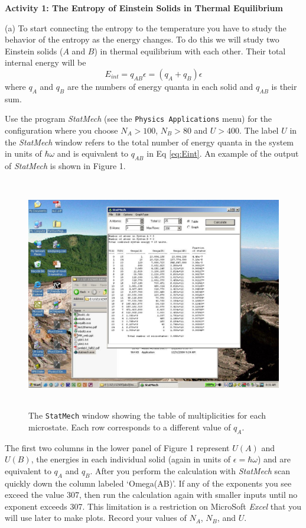 \textbf{Activity 1: The Entropy of Einstein Solids in Thermal Equilibrium}

(a) To start connecting the entropy to the temperature you have to study the 
behavior of the entropy as the energy changes.
To do this we will study two Einstein solids ($A$ and $B$) in thermal equilibrium with 
each other.
Their total internal energy will be
\begin{equation}\label{eq:Eint}
E_{int} = q_{AB}\epsilon = (q_A + q_B) \epsilon
\end{equation}
where $q_A$ and $q_B$ are the numbers of energy quanta in each solid and $q_{AB}$ is 
their sum.

Use the program {\it StatMech} (see the {\tt Physics Applications} menu)
for the configuration where you choose $N_A > 100$, $N_B > 80$ and $U>400$.
The label $U$ in the {\it StatMech} window refers to the total number of energy quanta 
in the system
in units of $\hbar \omega$ and is equivalent to $q_{AB}$  in Eq \ref{eq:Eint}.
An example of the output of {\it StatMech} is shown in Figure 1.
\begin{figure}[ht!]
\begin{center}
\includegraphics[height=4.0in]{entropy_temperature/statmech1.pdf}
\caption{The {\tt StatMech} window showing the table of multiplicities for each microstate.
Each row corresponds to a different value of $q_A$.}
\end{center}
\end{figure}
The first two columns in the lower panel of Figure 1 represent $U(A)$ and $U(B)$, 
the energies in each 
individual solid (again in units of $\epsilon = \hbar \omega$) and are equivalent to $q_A$ and $q_B$.
After you perform the calculation with {\it StatMech} scan quickly down the column
labeled `Omega(AB)'.
If any of the exponents you see exceed the value 307, then run the calculation again with 
smaller inputs until no exponent exceeds 307.
This limitation is a restriction on MicroSoft {\it Excel} that you will use later to make
plots.
Record your values of $N_A$, $N_B$, and $U$.
\vspace{15mm}


